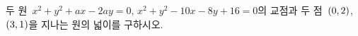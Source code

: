 두 원~$x^2+y^2+ax-2ay=0$, $x^2+y^2-10x-8y+16=0$의 교점과 두 점~$(0{,}\mkern3mu\mathopen{}2)$, $(3{,}\mkern3mu\mathopen{}1)$을 지나는 원의 넓이를 구하시오. 
